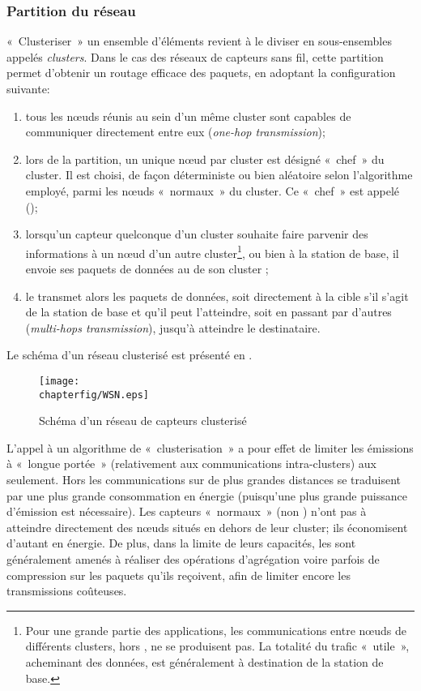         \subsubsection{Partition du réseau}
«~Clusteriser~» un ensemble d'éléments revient à le diviser en sous-ensembles appelés \textit{clusters}.
Dans le cas des réseaux de capteurs sans fil, cette partition permet d'obtenir un routage efficace des paquets, en adoptant la configuration suivante:
\begin{enumerate}
    \item tous les nœuds réunis au sein d'un même cluster sont capables de communiquer directement entre eux (\textit{one-hop transmission});
    \item lors de la partition, un unique nœud par cluster est désigné «~chef~» du cluster.
        Il est choisi, de façon déterministe ou bien aléatoire selon l'algorithme employé, parmi les nœuds «~normaux~» du cluster.
        Ce «~chef~» est appelé \ch (\CH);
    \item lorsqu'un capteur quelconque d'un cluster souhaite faire parvenir des informations à un nœud d'un autre cluster\footnote{Pour une grande partie des applications, les communications entre nœuds de différents clusters, hors \chs, ne se produisent pas. La totalité du trafic «~utile~», acheminant des données, est généralement à destination de la station de base.}, ou bien à la station de base, il envoie ses paquets de données au \ch de son cluster ;
    \item le \ch transmet alors les paquets de données, soit directement à la cible s'il s'agit de la station de base et qu'il peut l'atteindre, soit en passant par d'autres \chs (\textit{multi-hops transmission}), jusqu'à atteindre le destinataire.
\end{enumerate}
Le schéma d'un réseau clusterisé est présenté en .
\begin{figure}
    \centering
    \texttt{[image: \\chapterfig/WSN.eps]}
    \caption{Schéma d'un réseau de capteurs clusterisé}\label{st:fig:wsn}
\end{figure}
L'appel à un algorithme de « clusterisation » a pour effet de limiter les émissions à «~longue portée~» (relativement aux communications intra-clusters) aux \chs seulement.
Hors les communications sur de plus grandes distances se traduisent par une plus grande consommation en énergie (puisqu'une plus grande puissance d'émission est nécessaire).
Les capteurs «~normaux~» (non \chs) n'ont pas à atteindre directement des nœuds situés en dehors de leur cluster; ils économisent d'autant en énergie.
De plus, dans la limite de leurs capacités, les \chs sont généralement amenés à réaliser des opérations d'agrégation voire parfois de compression sur les paquets qu'ils reçoivent, afin de limiter encore les transmissions coûteuses.

